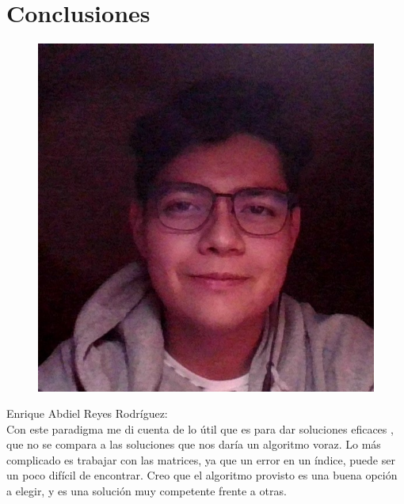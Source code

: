 \documentclass{article}
\begin{document}
\section{Conclusiones}
    \begin{figure}
        \centering
        \includegraphics[scale=0.2]{abdiel.png}
    \end{figure}
    Enrique Abdiel Reyes Rodríguez:\\
    Con este paradigma me di cuenta de lo útil que es para dar soluciones eficaces , que no se compara a las soluciones que nos daría un  algoritmo voraz. Lo más complicado es trabajar con las matrices, ya que un error en un índice, puede ser un poco difícil de encontrar.
    Creo que el algoritmo provisto es una buena opción a elegir, y es una solución muy competente frente a otras.\\
    
\end{document}
